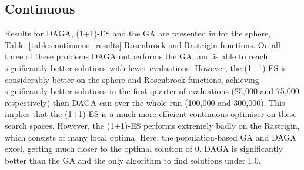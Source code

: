 \documentclass[runningheads,a4paper]{llncs}
\begin{document}
\subsection{Continuous}
Results for DAGA, (1+1)-ES and the GA are presented in for the sphere, Table~\ref{table:continuous_results} Rosenbrock and Rastrigin functions. On all three of these problems DAGA outperforms the GA, and is able to reach significantly better solutions with fewer evaluations. However, the (1+1)-ES is considerably better on the sphere and Rosenbrock functions, achieving significantly better solutions in the first quarter of evaluations (25,000 and 75,000 respectively) than DAGA can over the whole run (100,000 and 300,000). This implies that the (1+1)-ES is a much more efficient continuous optimiser on these search spaces. However, the (1+1)-ES performs extremely badly on the Rastrigin, which consists of many local optima. Here, the population-based GA and DAGA excel, getting much closer to the optimal solution of 0. DAGA is significantly better than the GA and the only algorithm to find solutions under 1.0. 
\end{document}
